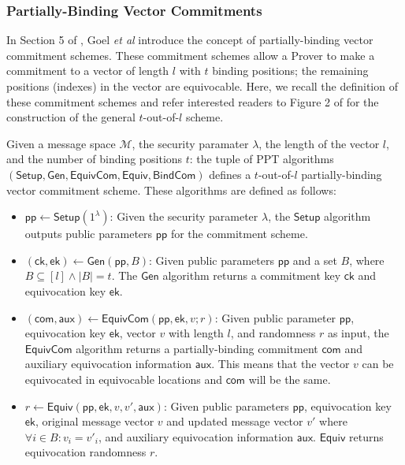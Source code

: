\subsubsection{Partially-Binding Vector Commitments}
In Section 5 of \cite{StackingSigmas}, Goel {\em{et al}} introduce the concept of partially-binding vector commitment schemes. 
These commitment schemes allow a Prover to make a commitment to a vector of length $l$ with $t$ binding positions; 
the remaining positions (indexes) in the vector are equivocable. 
Here, we recall the definition of these commitment schemes and refer interested readers to Figure 2 of \cite{StackingSigmas} for the construction of the general $t$-out-of-$l$ 
scheme. 

\begin{definition}
  Given a message space $\mathcal M$, the security paramater $\lambda$, the length of the vector $l$, and the number of binding positions $t$: 
  the tuple of PPT algorithms $(\mathsf{Setup}, \mathsf{Gen}, \mathsf{EquivCom}, \mathsf{Equiv}, \mathsf{BindCom})$ defines a $t$-out-of-$l$ 
  partially-binding vector commitment scheme. These algorithms are defined as follows:
  \begin{itemize}
  \item $\mathsf{pp} \leftarrow \mathsf{Setup}(1^\lambda)$: Given the security parameter $\lambda$,
  the $\mathsf{Setup}$ algorithm outputs public parameters $\mathsf{pp}$ for the commitment scheme.

  \item $(\mathsf{ck},\mathsf{ek}) \leftarrow \mathsf{Gen}(\mathsf{pp},B)$: Given public parameters $\mathsf{pp}$ 
  and a set $B$, where $B \subseteq [l] \land |B| = t$. The $\mathsf{Gen}$ algorithm returns a commitment key $\mathsf{ck}$ and equivocation key $\mathsf{ek}$.

  \item $(\mathsf{com},\mathsf{aux}) \leftarrow \mathsf{EquivCom}(\mathsf{pp},\mathsf{ek},v;r)$: Given public parameter 
  $\mathsf{pp}$, equivocation key $\mathsf{ek}$, vector $v$ with length $l$, and randomness $r$ as input, the $\mathsf{EquivCom}$ algorithm returns a 
  partially-binding commitment $\mathsf{com}$ and auxiliary equivocation information $\mathsf{aux}$. This means that the vector $v$ can be equivocated in 
  equivocable locations and $\mathsf{com}$ will be the same.  

  \item $r \leftarrow \mathsf{Equiv}(\mathsf{pp},\mathsf{ek},v,v',\mathsf{aux})$: Given public parameters $\mathsf{pp}$, 
  equivocation key $\mathsf{ek}$, original message vector $v$ and updated message vector $v'$ 
  where $\forall i \in B: v_i = v'_i$, and auxiliary equivocation information $\mathsf{aux}$. $\mathsf{Equiv}$ returns equivocation 
  randomness $r$.


\end{itemize}
\end{definition}

